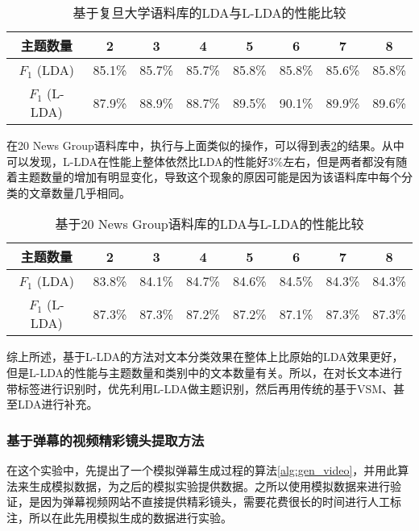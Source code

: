 \begin{table}[!hbt]
  \centering
  \caption{基于复旦大学语料库的LDA与L-LDA的性能比较}
  \begin{tabular}{|c|c|c|c|c|c|c|c|}
    \hline
    主题数量 & 2 & 3 & 4 & 5 & 6 & 7 & 8 \\
    \hline
    $F_1$ (LDA) & 85.1\% & 85.7\% & 85.7\% & 85.8\% & 85.8\% & 85.6\% & 85.8\% \\
    \hline
    $F_1$ (L-LDA) & 87.9\% & 88.9\% & 88.7\% & 89.5\% & 90.1\% & 89.9\% &89.6\% \\
    \hline
  \end{tabular}
  \label{tbl:classify2}
\end{table}

在20 News Group语料库中，执行与上面类似的操作，可以得到表\ref{tbl:classify3}的结果。从中可以发现，L-LDA在性能上整体依然比LDA的性能好3\%左右，但是两者都没有随着主题数量的增加有明显变化，导致这个现象的原因可能是因为该语料库中每个分类的文章数量几乎相同。

\begin{table}[!hbt]
  \centering
  \caption{基于20 News Group语料库的LDA与L-LDA的性能比较}
  \begin{tabular}{|c|c|c|c|c|c|c|c|}
    \hline
    主题数量 & 2 & 3 & 4 & 5 & 6 & 7 & 8 \\
    \hline
    $F_1$ (LDA) & 83.8\% & 84.1\% & 84.7\% & 84.6\% & 84.5\% & 84.3\% & 84.3\% \\
    \hline
    $F_1$ (L-LDA) & 87.3\% & 87.3\% & 87.2\% & 87.2\% & 87.1\% & 87.3\% &87.3\% \\
    \hline
  \end{tabular}
  \label{tbl:classify3}
\end{table}

综上所述，基于L-LDA的方法对文本分类效果在整体上比原始的LDA效果更好，但是L-LDA的性能与主题数量和类别中的文本数量有关。所以，在对长文本进行带标签进行识别时，优先利用L-LDA做主题识别，然后再用传统的基于VSM、甚至LDA进行补充。

\subsubsection{基于弹幕的视频精彩镜头提取方法}
在这个实验中，先提出了一个模拟弹幕生成过程的算法\ref{alg:gen_video}，并用此算法来生成模拟数据，为之后的模拟实验提供数据。之所以使用模拟数据来进行验证，是因为弹幕视频网站不直接提供精彩镜头，需要花费很长的时间进行人工标注，所以在此先用模拟生成的数据进行实验。

